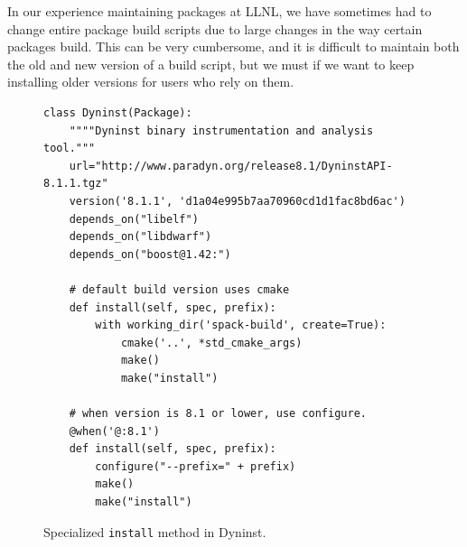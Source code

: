 In our experience maintaining packages at LLNL, we have sometimes had to change
entire package build scripts due to large changes in the way certain packages build.
This can be very cumbersome, and it is difficult to maintain both the old and new
version of a build script, but we must if we want to keep installing older versions
for users who rely on them.  

\begin{figure}
\begin{verbatim}
class Dyninst(Package):
    """"Dyninst binary instrumentation and analysis tool."""
    url="http://www.paradyn.org/release8.1/DyninstAPI-8.1.1.tgz"
    version('8.1.1', 'd1a04e995b7aa70960cd1d1fac8bd6ac')
    depends_on("libelf")                                                                            
    depends_on("libdwarf")                                                                          
    depends_on("boost@1.42:")
    
    # default build version uses cmake                                                                        
    def install(self, spec, prefix):
        with working_dir('spack-build', create=True):                                               
            cmake('..', *std_cmake_args)
            make()                                                                                  
            make("install")                                                                         

    # when version is 8.1 or lower, use configure.                                                                                                    
    @when('@:8.1')                                                                                  
    def install(self, spec, prefix):                                                                
        configure("--prefix=" + prefix)                                                             
        make()                                                                                      
        make("install")     
\end{verbatim}
\caption{
    Specialized {\tt install} method in Dyninst. 
	\label{fig:specialization}
}
\end{figure}

